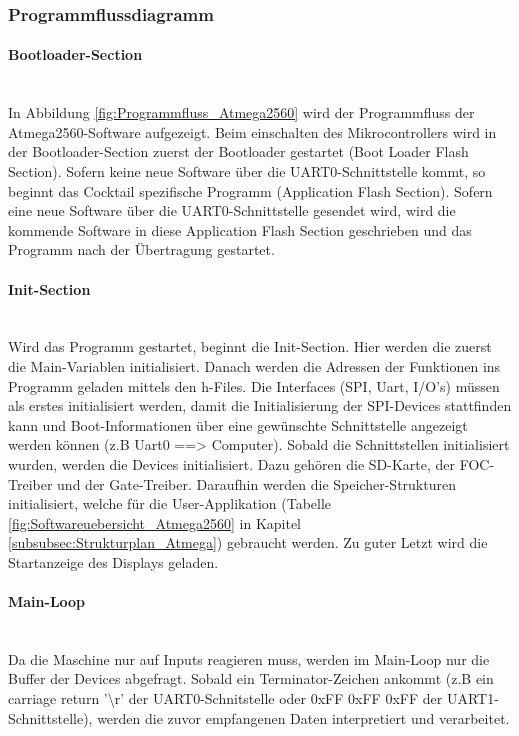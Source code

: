 \subsubsection{Programmflussdiagramm}
\label{subsubsec:Programmflussdiagramm}

\paragraph{Bootloader-Section}\mbox{}\\
In Abbildung \ref{fig:Programmfluss_Atmega2560} wird der Programmfluss der Atmega2560-Software aufgezeigt. Beim einschalten des Mikrocontrollers wird in der Bootloader-Section zuerst der Bootloader gestartet (Boot Loader Flash Section). Sofern keine neue Software über die UART0-Schnittstelle kommt, so beginnt das Cocktail spezifische Programm (Application Flash Section). Sofern eine neue Software über die UART0-Schnittstelle gesendet wird, wird die kommende Software in diese Application Flash Section geschrieben und das Programm nach der Übertragung gestartet.

\paragraph{Init-Section}\mbox{}\\
Wird das Programm gestartet, beginnt die Init-Section. Hier werden die zuerst die Main-Variablen initialisiert. Danach werden die Adressen der Funktionen ins Programm geladen mittels den h-Files. Die Interfaces (SPI, Uart, I/O's) müssen als erstes initialisiert werden, damit die Initialisierung der SPI-Devices stattfinden kann und Boot-Informationen über eine gewünschte Schnittstelle angezeigt werden können (z.B Uart0 ==> Computer). Sobald die Schnittstellen initialisiert wurden, werden die Devices initialisiert. Dazu gehören die SD-Karte, der FOC-Treiber und der Gate-Treiber. Daraufhin werden die Speicher-Strukturen initialisiert, welche für die User-Applikation (Tabelle \ref{fig:Softwareuebersicht_Atmega2560} in Kapitel \ref{subsubsec:Strukturplan_Atmega}) gebraucht werden. Zu guter Letzt wird die Startanzeige des Displays geladen.

\paragraph{Main-Loop}\mbox{}\\
Da die Maschine nur auf Inputs reagieren muss, werden im Main-Loop nur die Buffer der Devices abgefragt. Sobald ein Terminator-Zeichen ankommt (z.B ein carriage return '\textbackslash r' der UART0-Schnitstelle oder 0xFF 0xFF 0xFF der UART1-Schnittstelle), werden die zuvor empfangenen Daten interpretiert und verarbeitet.

